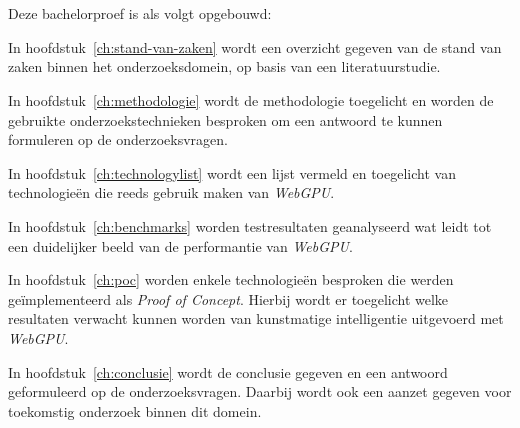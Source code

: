 \section{}%
\label{sec:opzet-bachelorproef}


Deze bachelorproef is als volgt opgebouwd:

\bigbreak{}

In hoofdstuk~\ref{ch:stand-van-zaken} wordt een overzicht gegeven van de stand van zaken binnen het onderzoeksdomein, op basis van een literatuurstudie.

\bigbreak{}

In hoofdstuk~\ref{ch:methodologie} wordt de methodologie toegelicht en worden de gebruikte onderzoekstechnieken besproken om een antwoord te kunnen formuleren op de onderzoeksvragen.

\bigbreak{}

In hoofdstuk~\ref{ch:technologylist} wordt een lijst vermeld en toegelicht van technologieën die reeds gebruik maken van \textit{WebGPU}.

\bigbreak{}

In hoofdstuk~\ref{ch:benchmarks} worden testresultaten geanalyseerd wat leidt tot een duidelijker beeld van de performantie van \textit{WebGPU}.

\bigbreak{}

In hoofdstuk~\ref{ch:poc} worden enkele technologieën besproken die werden geïmplementeerd als \textit{Proof of Concept}. Hierbij wordt er toegelicht welke resultaten verwacht kunnen worden van kunstmatige intelligentie uitgevoerd met \textit{WebGPU}.

\bigbreak{}

In hoofdstuk~\ref{ch:conclusie} wordt de conclusie gegeven en een antwoord geformuleerd op de onderzoeksvragen. Daarbij wordt ook een aanzet gegeven voor toekomstig onderzoek binnen dit domein.